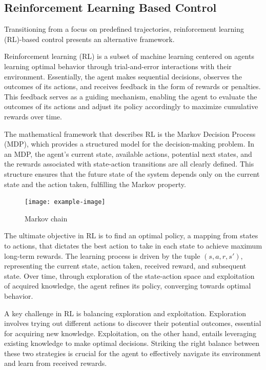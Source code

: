 \subsection{Reinforcement Learning Based Control}
Transitioning from a focus on predefined trajectories, reinforcement learning (RL)-based control presents an alternative framework.

Reinforcement learning (RL) is a subset of machine learning centered on agents learning optimal behavior through trial-and-error interactions with their environment. Essentially, the agent makes sequential decisions, observes the outcomes of its actions, and receives feedback in the form of rewards or penalties. This feedback serves as a guiding mechanism, enabling the agent to evaluate the outcomes of its actions and adjust its policy accordingly to maximize cumulative rewards over time.

The mathematical framework that describes RL is the Markov Decision Process (MDP), which provides a structured model for the decision-making problem. In an MDP, the agent's current state, available actions, potential next states, and the rewards associated with state-action transitions are all clearly defined. This structure ensures that the future state of the system depends only on the current state and the action taken, fulfilling the Markov property.

\begin{figure}[h]
    \centering
    \texttt{[image: example-image]}
    \caption{Markov chain}
\end{figure}

The ultimate objective in RL is to find an optimal policy, a mapping from states to actions, that dictates the best action to take in each state to achieve maximum long-term rewards. The learning process is driven by the tuple \((s,a,r,s')\), representing the current state, action taken, received reward, and subsequent state. Over time, through exploration of the state-action space and exploitation of acquired knowledge, the agent refines its policy, converging towards optimal behavior.

A key challenge in RL is balancing exploration and exploitation. Exploration involves trying out different actions to discover their potential outcomes, essential for acquiring new knowledge. Exploitation, on the other hand, entails leveraging existing knowledge to make optimal decisions. Striking the right balance between these two strategies is crucial for the agent to effectively navigate its environment and learn from received rewards.

